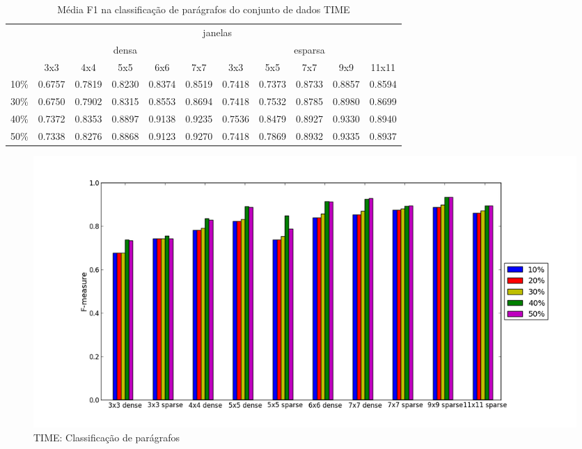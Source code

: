 \documentclass[a4paper,11pt]{article}
\begin{document}
  \begin{center}
    \begin{table}[p]
      \caption{Média F1 na classificação de parágrafos do conjunto de dados TIME}
      \begin{tabular}{ l | c c c c c || c c c c c | }
        \cline{2-11}
        & \multicolumn{10}{|c|}{janelas} \\
        \cline{2-11}
        & \multicolumn{5}{c||}{densa} & \multicolumn{5}{c|}{esparsa} \\
        \cline{2-11}
        & 3x3 & 4x4 & 5x5 & 6x6 & 7x7 & 3x3 & 5x5 & 7x7 & 9x9 & 11x11 \\
        \hline
        \multicolumn{1}{|l|}{10\%}& 0.6757& 0.7819& 0.8230& 0.8374& 0.8519& 0.7418& 0.7373& 0.8733& 0.8857& 0.8594\\
        \multicolumn{1}{|l|}{30\%}& 0.6750& 0.7902& 0.8315& 0.8553& 0.8694& 0.7418& 0.7532& 0.8785& 0.8980& 0.8699\\
        \multicolumn{1}{|l|}{40\%}& 0.7372& 0.8353& 0.8897& 0.9138& 0.9235& 0.7536& 0.8479& 0.8927& 0.9330& 0.8940\\
        \multicolumn{1}{|l|}{50\%}& 0.7338& 0.8276& 0.8868& 0.9123& 0.9270& 0.7418& 0.7869& 0.8932& 0.9335& 0.8937\\
        \hline  
      \end{tabular}
      \label{tab:time_f1_paragraph}
    \end{table}
  \end{center}

  \begin{figure}[p]
    \centerline{\includegraphics[width=1.2\textwidth]{assets/experiment_charts/time_TextRegion_paragraph_f1.png}}
    \caption{TIME: Classificação de parágrafos}
    \label{fig:time_TextRegion_paragraph_f1}
  \end{figure}  
\end{document}
